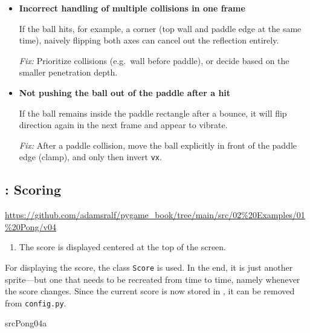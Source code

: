 \begin{warningbox}
\begin{itemize}
	\emph{Fix (robust):}  
	Split the movement into smaller steps (sub-stepping) or use swept collision detection.
	
	\item \textbf{Incorrect handling of multiple collisions in one frame}  
	
	If the ball hits, for example, a corner (top wall and paddle edge at the same time), naively flipping both axes can cancel out the reflection entirely.
	
	\emph{Fix:}  
	Prioritize collisions (e.g.\ wall before paddle),  
	or decide based on the smaller penetration depth.
	
	\item \textbf{Not pushing the ball out of the paddle after a hit}  
	
	If the ball remains inside the paddle rectangle after a bounce, it will flip direction again in the next frame and appear to vibrate.
	
	\emph{Fix:}  
	After a paddle collision, move the ball explicitly in front of the paddle edge (clamp), and only then invert \texttt{vx}.
\end{itemize}
\end{warningbox}




\subsection{: Scoring}
\begin{diskbox}
	\url{https://github.com/adamsralf/pygame_book/tree/main/src/02%20Examples/01%20Pong/v04}
\end{diskbox}
\begin{enumerate}
	\item The score is displayed centered at the top of the screen.\label{req0201PunkteOben}
\end{enumerate}
\er

For displaying the score, the class \texttt{Score} is used. In the end, it is just another sprite—but one that needs to be recreated from time to time, namely whenever the score changes. Since the current score is now stored in , it can be removed from \texttt{config.py}.

\newpage
{}
{srcPong04a}

